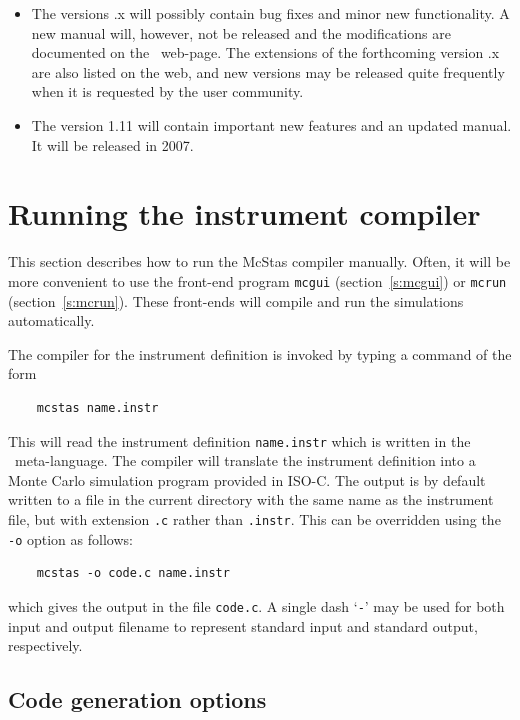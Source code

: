 \begin{itemize}
\item The versions {\version}.x will possibly contain bug fixes and minor new functionality. A new manual
will, however, not be released and the modifications are documented on the
\MCS\ web-page. The extensions of the forthcoming version {\version}.x are also listed
on the web, and new versions may be released quite frequently when it is requested
by the user community.
\item The version 1.11 will contain important new features and an
  updated manual. It will be released in 2007.
\end{itemize}

\section{Running the instrument compiler}
\label{s:running}

This section describes how to run the McStas compiler manually. Often,
it will be more convenient to use the front-end program \verb+mcgui+
(section~\ref{s:mcgui}) or \verb+mcrun+ (section~\ref{s:mcrun}). These
front-ends will compile and run the simulations automatically.
 

The compiler for the \MCS{} instrument definition
is invoked by typing a command of the form
\begin{verbatim}
    mcstas name.instr
\end{verbatim}
This will read the instrument definition \verb+name.instr+ which is
written in the \MCS\ meta-language. The compiler will translate the
instrument definition into a Monte Carlo simulation program provided in
ISO-C. The output is by default written to a file in the current
directory with the same name as the instrument file, but with extension
\verb+.c+ rather than \verb+.instr+. This can be overridden using the
\verb+-o+ option as follows:
\begin{verbatim}
    mcstas -o code.c name.instr
\end{verbatim}
which gives the output in the file \verb+code.c+.
A single dash `\verb+-+' may be used for both input and output filename
to represent standard input and standard output, respectively.


\subsection{Code generation options}


